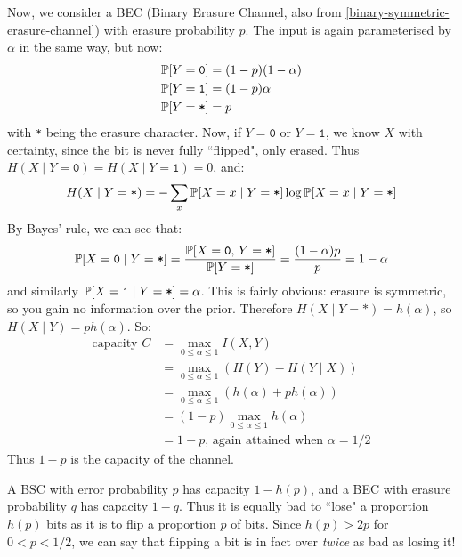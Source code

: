 \documentclass{article}
\begin{document}
\begin{example}
	Now, we consider a BEC
	(Binary Erasure Channel, also from \ref{binary-symmetric-erasure-channel})
	with erasure probability $p$.
	The input is again parameterised by $\alpha$ in the same way, but now:
    \begin{align*}
    	\P[Y = \texttt{0}] &= (1-p)(1-\alpha) \\
    	\P[Y = \texttt{1}] &= (1-p)\alpha \\
    	\P[Y = \texttt{*}] &= p
	\end{align*}
	with \texttt{*} being the erasure character.
	Now, if $Y = \texttt{0}$ or $Y = \texttt{1}$,
	we know $X$ with certainty,
	since the bit is never fully ``flipped", only erased.
	Thus $H(X \mid Y = \texttt{0}) = H(X \mid Y = \texttt{1}) = 0$, and:
	\[
	H(X \mid Y = \texttt{*}) =
	-\sum_{x} \P[X = x \mid Y = \texttt{*}] \log \P[X = x \mid Y = \texttt{*}]
	\]
	By Bayes' rule, we can see that:
	\[
	\P[X = \texttt{0} \mid Y = \texttt{*}] =
	\frac{\P[X = \texttt{0}, \, Y = \texttt{*}]}{\P[Y = \texttt{*}]} =
	\frac{(1-\alpha)p}{p} = 1-\alpha
	\]
	and similarly $\P[X = \texttt{1} \mid Y = \texttt{*}] = \alpha$.
	This is fairly obvious: erasure is symmetric,
	so you gain no information over the prior.
	Therefore $H(X \mid Y = \texttt{*}) = h(\alpha)$,
	so $H(X \mid Y) = ph(\alpha)$. So:
	\begin{align*}
    	\text{capacity } C &= \max_{0 \leq \alpha \leq 1} I(X, Y) \\
    	&= \max_{0 \leq \alpha \leq 1} (H(Y) - H(Y \mid X)) \\
    	&= \max_{0 \leq \alpha \leq 1} (h(\alpha) + ph(\alpha)) \\
    	&= (1-p) \max_{0 \leq \alpha \leq 1} h(\alpha) \\
    	&= 1 - p \text{, again attained when $\alpha = 1/2$}
	\end{align*}
	Thus $1-p$ is the capacity of the channel.
\end{example}

\begin{corollary}
    A BSC with error probability $p$ has capacity $1 - h(p)$,
    and a BEC with erasure probability $q$ has capacity $1-q$.
    Thus it is equally bad to ``lose" a proportion $h(p)$ bits
    as it is to flip a proportion $p$ of bits.
    Since $h(p) > 2p$ for $0 < p < 1/2$, we can say that
    flipping a bit is in fact over \textit{twice} as bad as losing it!
\end{corollary}
\end{document}
